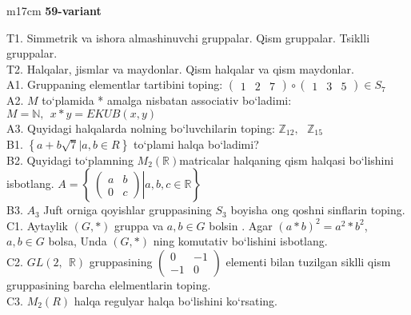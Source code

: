 \documentclass{article}
\begin{document}
\begin{tabular}{m{17cm}}
\textbf{59-variant}
\newline

T1. Simmetrik va ishora almashinuvchi gruppalar. Qism gruppalar. Tsiklli gruppalar. \\
T2. Halqalar, jismlar va maydonlar. Qism halqalar va qism maydonlar. \\
A1. Gruppaning elementlar tartibini toping: \(\begin{pmatrix}
1 & 2 & 7
\end{pmatrix} \circ \begin{pmatrix}
1 & 3 & 5
\end{pmatrix} \in S_{7}\) \\
A2. \(M\) to`plamida * amalga nisbatan associativ bo`ladimi: \(M\mathbb{= N},\ \ x*y = EKUB(x,y)\) \\
A3. Quyidagi halqalarda nolning bo`luvchilarin toping: \(\mathbb{Z}_{12},\ \ \ \mathbb{Z}_{15}\) \\
B1. \(\left\{ a + b\sqrt{7}|a,b \in R \right\}\) to`plami halqa bo`ladimi? \\
B2. Quyidagi to`plamning \(M_{2}(\mathbb{R})\)matricalar halqaning qism halqasi bo`lishini isbotlang. \(A = \left\{ \left. \ \begin{pmatrix}
a & b \\
0 & c
\end{pmatrix} \right|a,b,c\mathbb{\in R} \right\}\) \\
B3. \(A_{3}\) Juft orniga qoyishlar gruppasining \(S_{3}\) boyisha o\textquotesingle ng qo\textquotesingle shni sinflarin toping. \\
C1. Aytaylik \((G,*)\) gruppa va \(a,b \in G\) bo\textquotesingle lsin . Agar \((a*b)^{2} = a^{2}*b^{2}\), \(a,b \in G\) bolsa, Unda \((G,*)\) ning komutativ bo`lishini isbotlang. \\
C2. \(GL(2,\mathbb{\ \ R})\) gruppasining \(\begin{pmatrix}
0 & - 1 \\
 - 1 & 0
\end{pmatrix}\) elementi bilan tuzilgan siklli qism gruppasining barcha elelmentlarin toping. \\
C3. \(M_{2}(R)\) halqa regulyar halqa bo`lishini ko`rsating. \\

\end{tabular}
\vspace{1cm}
\end{document}
